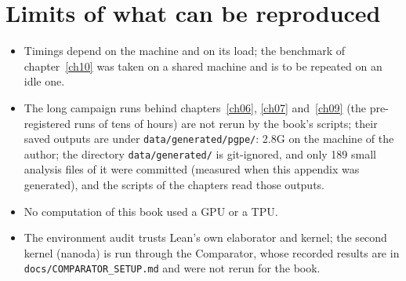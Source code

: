 \section{Limits of what can be reproduced}
\begin{itemize}[nosep]
\item Timings depend on the machine and on its load; the benchmark of chapter~\ref{ch10} was taken on a shared machine and is to be repeated on an idle one.
\item The long campaign runs behind chapters~\ref{ch06}, \ref{ch07} and~\ref{ch09} (the pre-registered runs of tens of hours) are not rerun by the book's scripts; their saved outputs are under \texttt{data/\allowbreak{}generated/\allowbreak{}pgpe/\allowbreak{}}: 2.8G on the machine of the author; the directory \texttt{data/\allowbreak{}generated/\allowbreak{}} is git-ignored, and only 189 small analysis files of it were committed (measured when this appendix was generated), and the scripts of the chapters read those outputs.
\item No computation of this book used a GPU or a TPU.
\item The environment audit trusts Lean's own elaborator and kernel; the second kernel (nanoda) is run through the Comparator, whose recorded results are in \texttt{docs/\allowbreak{}COMPARATOR\_\allowbreak{}SETUP.\allowbreak{}md} and were not rerun for the book.
\end{itemize}
